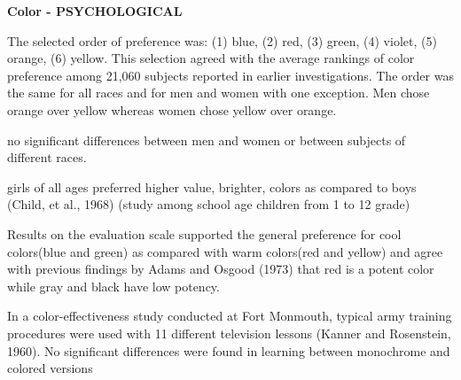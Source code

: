 %		
		
		\textbf{Color - PSYCHOLOGICAL}
		
		The selected order of preference was: (1) blue, (2) red, (3) green, (4) violet, (5) orange, (6) yellow. This selection agreed with the average rankings of color preference among 21,060 subjects reported in earlier investigations. The order was the same for all races and for men and women with one exception. Men chose orange over yellow whereas women chose yellow over orange. \cite{Pert1996}
		
		no significant differences between men and women or between subjects of different races.\cite{Pert1996}
		
		girls of all ages preferred higher value, brighter, colors as compared to boys (Child, et al., 1968) \cite{Pert1996} (study among school age children from 1 to 12 grade)
		
		Results on the evaluation scale supported the general preference for cool colors(blue and green) as compared with warm colors(red and yellow) and agree with previous findings by Adams and Osgood (1973) that red is a potent color while gray and black have low potency. \cite{Pert1996}
		
		In a color-effectiveness study conducted at Fort Monmouth, typical army training procedures were used with 11 different television lessons (Kanner and Rosenstein, 1960). No significant differences were found in learning between monochrome and colored versions \cite{Pert1996}
		
